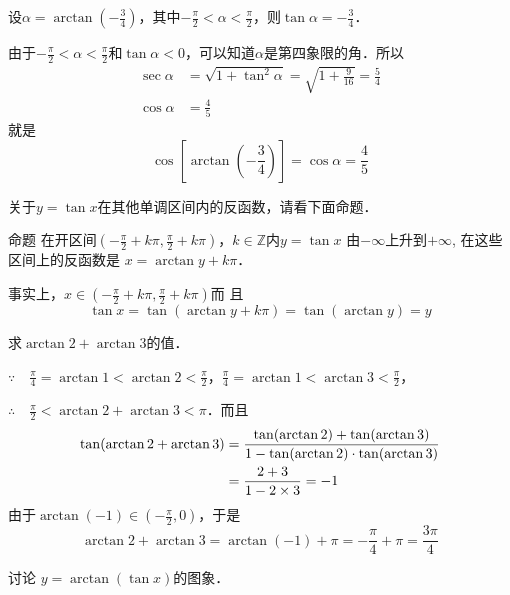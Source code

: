 \begin{solution}
设$\alpha=\arctan\left(-\frac{3}{4}\right)$，其中$-\frac{\pi}{2}<\alpha<\frac{\pi}{2}$，则$\tan\alpha=-\frac{3}{4}$．

由于$-\frac{\pi}{2}<\alpha<\frac{\pi}{2}$和$\tan\alpha<0$，可以知道$\alpha$是第四象限的角．所以
\[\begin{split}
    \sec\alpha&=\sqrt{1+\tan^2\alpha}=\sqrt{1+\frac{9}{16}}=\frac{5}{4}\\
    \cos\alpha&=\frac{4}{5}
\end{split}\]
就是
\[\cos\left[\arctan\left(-\frac{3}{4}\right)\right]=\cos\alpha=\frac{4}{5}\]
\end{solution}

关于$y=\tan x$在其他单调区间内的反函数，请看下面命题．

\begin{blk}{命题}
    在开区间$\left(-\frac{\pi}{2}+k\pi ,\frac{\pi}{2}+k\pi 
\right)$，$k\in\mathbb{Z}$内$y=\tan x$
由$-\infty$上升到$+\infty$, 在这些区间上的反函数是
$x=\arctan y+k\pi$．
\end{blk}

事实上，$x\in \left(-\frac{\pi}{2}+k\pi ,\frac{\pi}{2}+k\pi 
\right)$而
且
\[\tan x=\tan (\arctan y+k\pi )=\tan (\arctan y)=y\]




\begin{example}
    求$\arctan 2+\arctan 3$的值．
\end{example}

\begin{solution}
    $\because\quad \frac{\pi}{4}=\arctan 1<\arctan 2<\frac{\pi}{2}$，$\frac{\pi}{4}=\arctan 1<\arctan 3<\frac{\pi}{2}$，

    $\therefore\quad \frac{\pi}{2}<\arctan 2+\arctan 3<\pi$．而且
\[\begin{split}
    \tan(\arctan 2+\arctan 3)&=\dfrac{\tan (\arctan 2)+\tan (\arctan  3)}{1-\tan(\arctan 2)\cdot \tan (\arctan 3)}\\
    &=\dfrac{2+3}{1-2\times 3}=-1
\end{split}\]
由于$\arctan (-1)\in \left(-\frac{\pi}{2},0\right)$，于是
\[\arctan 2+\arctan 3=\arctan (-1)+\pi=-\frac{\pi}{4}+\pi=\frac{3\pi}{4}\]
\end{solution}

\begin{example}
    讨论 $y=\arctan (\tan x)$的图象．
\end{example}

